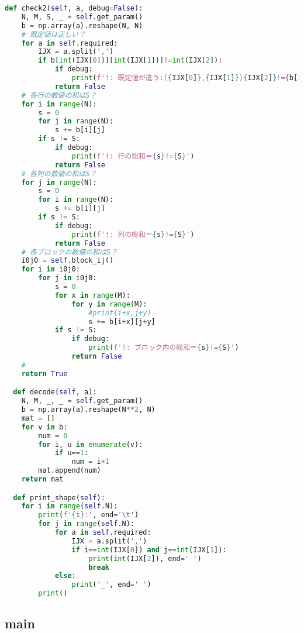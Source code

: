 \documentclass[uplatex,dvipdfmx,a4paper,11pt,oneside,openany]{jsbook}
\begin{document}
\begin{lstlisting}[language=Python]
  def check2(self, a, debug=False):
    N, M, S, _ = self.get_param()
    b = np.array(a).reshape(N, N)
    # 既定値は正しい？
    for a in self.required:
        IJX = a.split(',')
        if b[int(IJX[0])][int(IJX[1])]!=int(IJX[2]):
            if debug:
                print(f'!: 既定値が違う:({IJX[0]},{IJX[1]}){IJX[2]}!={b[int(IJX[0])][int(IJX[1])]}')
            return False
    # 各行の数値の和はS？
    for i in range(N):
        s = 0
        for j in range(N):
            s += b[i][j]
        if s != S:
            if debug:
                print(f'!: 行の総和＝{s}!={S}')
            return False
    # 各列の数値の和はS？
    for j in range(N):
        s = 0
        for i in range(N):
            s += b[i][j]
        if s != S:
            if debug:
                print(f'!: 列の総和＝{s}!={S}')
            return False
    # 各ブロックの数値の和はS？
    i0j0 = self.block_ij()
    for i in i0j0:
        for j in i0j0:
            s = 0
            for x in range(M):
                for y in range(M):
                    #print(i+x,j+y)
                    s += b[i+x][j+y]
            if s != S:
                if debug:
                    print(f'!: ブロック内の総和＝{s}!={S}')
                return False
    #
    return True

  def decode(self, a):
    N, M, _, _ = self.get_param()
    b = np.array(a).reshape(N**2, N)
    mat = []
    for v in b:
        num = 0
        for i, u in enumerate(v):
            if u==1:
                num = i+1
        mat.append(num)
    return mat

  def print_shape(self):
    for i in range(self.N):
        print(f'{i}:', end='\t')
        for j in range(self.N):
            for a in self.required:
                IJX = a.split(',')
                if i==int(IJX[0]) and j==int(IJX[1]):
                    print(int(IJX[2]), end=' ')
                    break
            else:
                print('_', end=' ')
        print()
\end{lstlisting}

\subsection{main}
\end{document}
